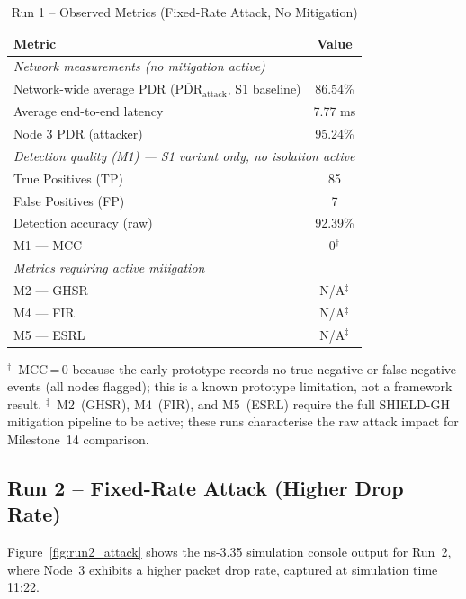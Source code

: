 \documentclass[12pt, a4paper]{report}
\begin{document}
\begin{table}[H]
\renewcommand{\arraystretch}{1.3}
\caption{Run 1 -- Observed Metrics (Fixed-Rate Attack, No Mitigation)}
\label{tab:run1_metrics}
\centering
\small
\begin{tabular}{|l|c|}
\hline
\textbf{Metric} & \textbf{Value} \\
\hline
\multicolumn{2}{|l|}{\textit{Network measurements (no mitigation active)}} \\
\hline
Network-wide average PDR
  ($\overline{\text{PDR}}_{\text{attack}}$, S1 baseline)  & 86.54\% \\
Average end-to-end latency                                  & 7.77 ms \\
Node 3 PDR (attacker)                                       & 95.24\% \\
\hline
\multicolumn{2}{|l|}{\textit{Detection quality (M1) ---
  S1 variant only, no isolation active}} \\
\hline
True Positives (TP)   & 85 \\
False Positives (FP)  & 7 \\
Detection accuracy (raw) & 92.39\% \\
M1 --- MCC            & 0$^{\dagger}$ \\
\hline
\multicolumn{2}{|l|}{\textit{Metrics requiring active mitigation}} \\
\hline
M2 --- GHSR           & N/A$^{\ddagger}$ \\
M4 --- FIR            & N/A$^{\ddagger}$ \\
M5 --- ESRL           & N/A$^{\ddagger}$ \\
\hline
\end{tabular}
\vspace{1mm}
\footnotesize{%
$^{\dagger}$~MCC\,=\,0 because the early prototype records no true-negative
or false-negative events (all nodes flagged); this is a known prototype
limitation, not a framework result.
$^{\ddagger}$~M2~(GHSR), M4~(FIR), and M5~(ESRL) require the full
SHIELD-GH mitigation pipeline to be active; these runs characterise the raw
attack impact for Milestone~14 comparison.}
\end{table}

\subsection{Run 2 -- Fixed-Rate Attack (Higher Drop Rate)}
\label{subsec:run2}

Figure~\ref{fig:run2_attack} shows the ns-3.35 simulation console output for Run~2, where Node~3 exhibits a higher packet drop rate, captured at simulation time 11:22.
\end{document}
